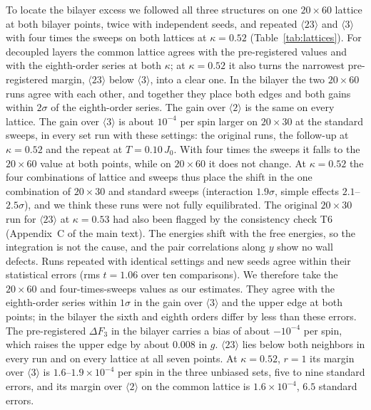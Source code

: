 \documentclass[aps,prb,twocolumn,superscriptaddress,floatfix]{revtex4-2}
\begin{document}
To locate the bilayer excess we followed all three structures on one $20\times60$ lattice at both bilayer points, twice
with independent seeds, and repeated $\langle23\rangle$ and $\langle3\rangle$ with four times the sweeps on both lattices
at $\kappa=0.52$ (Table~\ref{tab:lattices}). For decoupled layers the common lattice agrees with the pre-registered
values and with the eighth-order series at both $\kappa$; at $\kappa=0.52$ it also turns the narrowest pre-registered
margin, $\langle23\rangle$ below $\langle3\rangle$, into a clear one. In the bilayer the two $20\times60$ runs agree with
each other, and together they place both edges and both gains within $2\sigma$ of the eighth-order series. The gain over
$\langle2\rangle$ is the same on every lattice. The gain over $\langle3\rangle$ is about $10^{-4}$ per spin larger on
$20\times30$ at the standard sweeps, in every set run with these settings: the original runs, the follow-up at
$\kappa=0.52$ and the repeat at $T=0.10\,J_0$. With four times the sweeps it falls to the $20\times60$ value at both
points, while on $20\times60$ it does not change. At $\kappa=0.52$ the four combinations of lattice and sweeps thus
place the shift in the one combination of $20\times30$ and standard sweeps (interaction $1.9\sigma$, simple effects
$2.1$--$2.5\sigma$), and we think these runs were not fully equilibrated. The original $20\times30$ run for
$\langle23\rangle$ at $\kappa=0.53$ had also been flagged by the consistency check T6 (Appendix~C of the main text). The
energies shift with the free energies, so the integration is not the cause, and the pair correlations along $y$ show no
wall defects. Runs repeated with identical settings and new seeds agree within their statistical errors (rms $t=1.06$
over ten comparisons). We therefore take the $20\times60$ and four-times-sweeps values as our estimates. They agree with
the eighth-order series within $1\sigma$ in the gain over $\langle3\rangle$ and the upper edge at both points; in the
bilayer the sixth and eighth orders differ by less than these errors. The pre-registered $\Delta F_3$ in the bilayer
carries a bias of about $-10^{-4}$ per spin, which raises the upper edge by about $0.008$ in $g$. $\langle23\rangle$ lies
below both neighbors in every run and on every lattice at all seven points. At $\kappa=0.52$, $r=1$ its margin over
$\langle3\rangle$ is $1.6$--$1.9\times10^{-4}$ per spin in the three unbiased sets, five to nine standard errors, and
its margin over $\langle2\rangle$ on the common lattice is $1.6\times10^{-4}$, $6.5$ standard errors.
\end{document}
